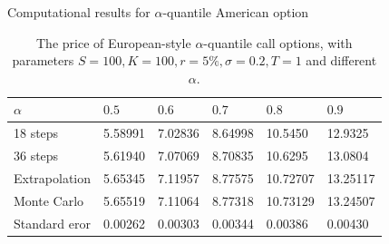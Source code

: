 \documentclass[cjk,10pt]{beamer}
\begin{document}
%






\begin{frame}{Computational results for $\alpha$-quantile American option}
\begin{table}[p]
\caption{The price of European-style $\alpha$-quantile call options, with parameters
	$S=100, K=100, r=5\%, \sigma=0.2, T=1$ and different $\alpha$. }
\begin{center}
\begin{tabular}{l|lllll}
$\alpha$ & $0.5$ & $0.6$ & $0.7$ & $0.8$ & $0.9$       \\
\hline
18 steps  & 5.58991 & 7.02836 & 8.64998 & 10.5450 & 12.9325\\
36 steps  & 5.61940 & 7.07069 & 8.70835 & 10.6295 & 13.0804\\
\hline
Extrapolation  & 5.65345  & 7.11957  & 8.77575 & 10.72707 &13.25117 \\
\hline
Monte Carlo & 5.65519 &7.11064 & 8.77318 & 10.73129 & 13.24507\\
Standard eror &  0.00262 & 0.00303 & 0.00344 & 0.00386 & 0.00430    
\end{tabular}
\end{center}
\label{fig:euro9}
\end{table}%

\end{frame}
\end{document}
